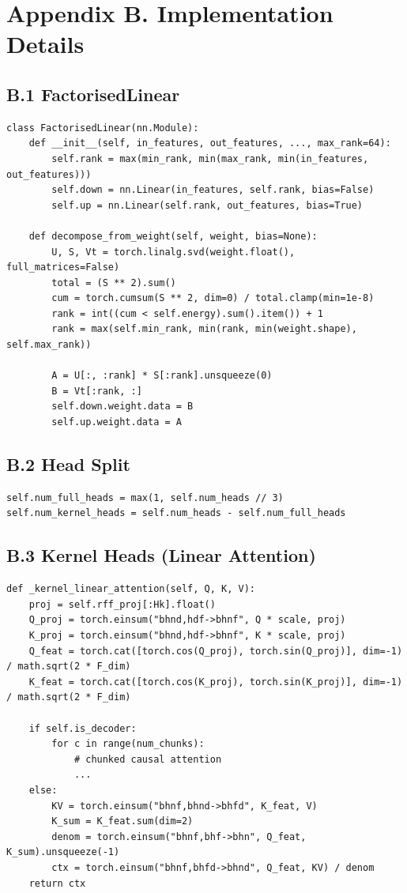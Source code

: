 
\section{Appendix B. Implementation Details}

\subsection{B.1 FactorisedLinear}

\begin{lstlisting}
class FactorisedLinear(nn.Module):
    def __init__(self, in_features, out_features, ..., max_rank=64):
        self.rank = max(min_rank, min(max_rank, min(in_features, out_features)))
        self.down = nn.Linear(in_features, self.rank, bias=False)
        self.up = nn.Linear(self.rank, out_features, bias=True)

    def decompose_from_weight(self, weight, bias=None):
        U, S, Vt = torch.linalg.svd(weight.float(), full_matrices=False)
        total = (S ** 2).sum()
        cum = torch.cumsum(S ** 2, dim=0) / total.clamp(min=1e-8)
        rank = int((cum < self.energy).sum().item()) + 1
        rank = max(self.min_rank, min(rank, min(weight.shape), self.max_rank))
        
        A = U[:, :rank] * S[:rank].unsqueeze(0)
        B = Vt[:rank, :]
        self.down.weight.data = B
        self.up.weight.data = A
\end{lstlisting}

\subsection{B.2 Head Split}

\begin{lstlisting}
self.num_full_heads = max(1, self.num_heads // 3)
self.num_kernel_heads = self.num_heads - self.num_full_heads
\end{lstlisting}

\subsection{B.3 Kernel Heads (Linear Attention)}

\begin{lstlisting}
def _kernel_linear_attention(self, Q, K, V):
    proj = self.rff_proj[:Hk].float()
    Q_proj = torch.einsum("bhnd,hdf->bhnf", Q * scale, proj)
    K_proj = torch.einsum("bhnd,hdf->bhnf", K * scale, proj)
    Q_feat = torch.cat([torch.cos(Q_proj), torch.sin(Q_proj)], dim=-1) / math.sqrt(2 * F_dim)
    K_feat = torch.cat([torch.cos(K_proj), torch.sin(K_proj)], dim=-1) / math.sqrt(2 * F_dim)
    
    if self.is_decoder:
        for c in range(num_chunks):
            # chunked causal attention
            ...
    else:
        KV = torch.einsum("bhnf,bhnd->bhfd", K_feat, V)
        K_sum = K_feat.sum(dim=2)
        denom = torch.einsum("bhnf,bhf->bhn", Q_feat, K_sum).unsqueeze(-1)
        ctx = torch.einsum("bhnf,bhfd->bhnd", Q_feat, KV) / denom
    return ctx
\end{lstlisting}


